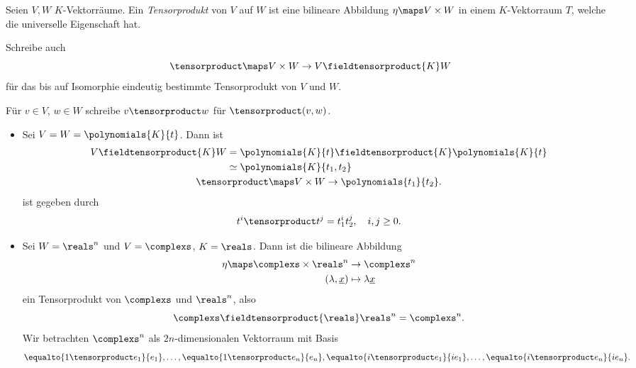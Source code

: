 \begin{definition*}
  Seien \( V,W \) \( K \)-Vektorräume. Ein \emph{Tensorprodukt} von \( V \) auf \( W \) ist eine bilineare Abbildung \( \eta\maps V\times W \) in einem \( K \)-Vektorraum \( T \), welche die universelle Eigenschaft \tensorproperty hat.
  
  Schreibe auch
  \begin{equation*}
    \tensorproduct \maps V\times W\to V \fieldtensorproduct{K} W
  \end{equation*}
  für das bis auf Isomorphie eindeutig bestimmte Tensorprodukt von \( V \) und \( W \).

  Für \( v\in V \), \( w\in W \) schreibe \( v\tensorproduct w\) für \( \tensorproduct(v,w) \).
\end{definition*}
\begin{beispiele*}
  \begin{itemize}
    \item Sei \( V=W=\polynomials{K}{t} \). Dann ist
    \begin{align*}
      V\fieldtensorproduct{K} W&=\polynomials{K}{t}\fieldtensorproduct{K} \polynomials{K}{t}\\
      &\simeq \polynomials{K}{t_1,t_2}\\
      \tensorproduct\maps V\times W\to \polynomials{t_1}{t_2}\span.
    \end{align*}
    ist gegeben durch
    \begin{equation*}
      t^i\tensorproduct t^j=t_1^i t_2^j,\quad i,j\geq 0.
    \end{equation*}
    \item Sei \( W=\reals^n \) und \( V=\complexs \), \( K=\reals \). Dann ist die bilineare Abbildung
    \begin{align*}
      \eta\maps \complexs\times \reals^n&\to \complexs^n\\
      (\lambda,\underline{x})&\mapsto \lambda\underline{x} 
    \end{align*}
    ein Tensorprodukt von \( \complexs \) und \( \reals^n \), also
    \begin{equation*}
      \complexs \fieldtensorproduct{\reals} \reals^n=\complexs^n.
    \end{equation*}
    Wir betrachten \( \complexs^n \) als \( 2n \)-dimensionalen Vektorraum mit Basis
    \begin{align*}
      \equalto{1\tensorproduct e_1}{e_1},\dotsc,\equalto{1\tensorproduct e_n}{e_n},\equalto{i\tensorproduct e_1}{ie_1},\dotsc,\equalto{i\tensorproduct e_n}{ie_n}.
    \end{align*}
  \end{itemize}
\end{beispiele*}
